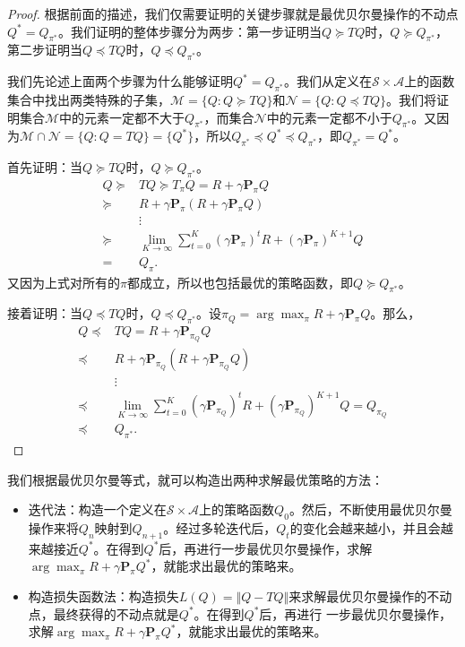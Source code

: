 \begin{proof}
    根据前面的描述，我们仅需要证明的关键步骤就是最优贝尔曼操作的不动点$Q^* = Q_{\pi^*}$。我们证明的整体步骤分为两步：第一步证明当$Q \succeq TQ$时，$Q \succeq Q_{\pi^*}$，第二步证明当$Q \preceq TQ$时，$Q \preceq Q_{\pi^*}$。
    
    我们先论述上面两个步骤为什么能够证明$Q^* = Q_{\pi^*}$。我们从定义在$\mathcal{S}\times\mathcal{A}$上的函数集合中找出两类特殊的子集，$\mathcal{M} = \{Q: Q \succeq TQ\}$和$\mathcal{N} = \{Q: Q\preceq TQ\}$。我们将证明集合$\mathcal{M}$中的元素一定都不大于$Q_{\pi^*}$，而集合$\mathcal{N}$中的元素一定都不小于$Q_{\pi^*}$。又因为$\mathcal{M} \cap \mathcal{N} = \{Q: Q = TQ\} = \{Q^*\}$，所以$Q_{\pi^*} \preceq Q^* \preceq Q_{\pi^*}$，即$Q_{\pi^*} = Q^*$。

    首先证明：当$Q \succeq TQ$时，$Q \succeq Q_{\pi^*}$。
    \begin{align*}
        Q \succeq& TQ \succeq T_{\pi} Q = R + \gamma \mathbf{P}_{\pi} Q\\
        \succeq& R + \gamma \mathbf{P}_{\pi} (R + \gamma \mathbf{P}_{\pi} Q)\\
        &\vdots\\
        \succeq& \lim_{K \rightarrow \infty} \sum^K_{t = 0} (\gamma \mathbf{P}_{\pi})^tR
        + (\gamma \mathbf{P}_{\pi})^{K+1} Q\\
        =& Q_{\pi}.
    \end{align*}
    又因为上式对所有的$\pi$都成立，所以也包括最优的策略函数，即$Q \succeq Q_{\pi^*}$。

    接着证明：当$Q \preceq TQ$时，$Q \preceq Q_{\pi^*}$。设$\pi_{Q} = \arg\max_{\pi} R + \gamma \mathbf{P}_{\pi}Q$。那么，
    \begin{align*}
        Q \preceq& TQ = R + \gamma \mathbf{P}_{\pi_Q} Q\\
        \preceq& R + \gamma \mathbf{P}_{\pi_Q}(R + \gamma \mathbf{P}_{\pi_Q} Q)\\
        &\vdots\\
        \preceq& \lim_{K \rightarrow \infty} \sum^K_{t = 0} (\gamma\mathbf{P}_{\pi_Q})^t
        R + (\gamma \mathbf{P}_{\pi_Q})^{K+1}Q = Q_{\pi_Q}\\
        \preceq& Q_{\pi^*}.
    \end{align*}
\end{proof}

我们根据最优贝尔曼等式，就可以构造出两种求解最优策略的方法：
\begin{itemize}
    \item 迭代法：构造一个定义在$\mathcal{S}\times\mathcal{A}$上的策略函数$Q_0$。然后，不断使用最优贝尔曼操作来将$Q_n$映射到$Q_{n+1}$。经过多轮迭代后，$Q_{t}$的变化会越来越小，并且会越来越接近$Q^*$。在得到$Q^*$后，再进行一步最优贝尔曼操作，求解$\arg\max_{\pi} R + \gamma \mathbf{P}_{\pi}Q^*$，就能求出最优的策略来。
    \item 构造损失函数法：构造损失$L(Q) = \Vert Q - TQ \Vert$来求解最优贝尔曼操作的不动点，最终获得的不动点就是$Q^*$。在得到$Q^*$后，再进行 一步最优贝尔曼操作，求解$\arg\max_{\pi} R + \gamma \mathbf{P}_{\pi}Q^*$，就能求出最优的策略来。
\end{itemize}

